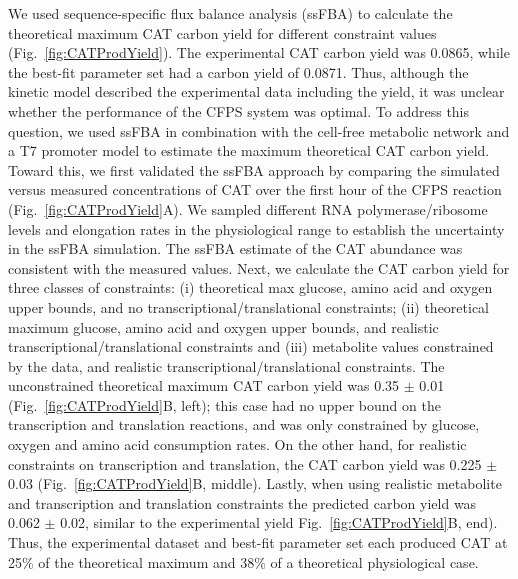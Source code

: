 \documentclass[12pt]{article}
\begin{document}
We used sequence-specific flux balance analysis (ssFBA) to calculate the theoretical maximum CAT carbon yield for different constraint values (Fig.~\ref{fig:CATProdYield}).
The experimental CAT carbon yield was 0.0865, while the best-fit parameter set had a carbon yield of 0.0871.
Thus, although the kinetic model described the experimental data including the yield, it was unclear whether the performance of the CFPS system was optimal.
To address this question, we used ssFBA in combination with the cell-free metabolic network and a T7 promoter model to estimate the maximum theoretical CAT carbon yield.
Toward this, we first validated the ssFBA approach by comparing the simulated versus measured concentrations of CAT over the first hour of the CFPS reaction (Fig.~\ref{fig:CATProdYield}A).
We sampled different RNA polymerase/ribosome levels and elongation rates in the physiological range to establish the uncertainty in the ssFBA simulation.
The ssFBA estimate of the CAT abundance was consistent with the measured values. Next, we calculate the CAT carbon yield for three classes of constraints:
(i) theoretical max glucose, amino acid and oxygen upper bounds, and no transcriptional/translational constraints; (ii) theoretical maximum glucose, amino acid and oxygen upper bounds,
and realistic transcriptional/translational constraints and (iii) metabolite values constrained by the data, and realistic transcriptional/translational constraints.
The unconstrained theoretical maximum CAT carbon yield was 0.35 $\pm$ 0.01 (Fig.~\ref{fig:CATProdYield}B, left);
this case had no upper bound on the transcription and translation reactions, and was only constrained by glucose, oxygen and amino acid consumption rates.
On the other hand, for realistic constraints on transcription and translation, the CAT carbon yield was 0.225 $\pm$ 0.03 (Fig.~\ref{fig:CATProdYield}B, middle).
Lastly, when using realistic metabolite and transcription and translation constraints the predicted carbon yield was 0.062 $\pm$ 0.02, similar to the experimental yield Fig.~\ref{fig:CATProdYield}B, end).
Thus, the experimental dataset and best-fit parameter set each produced CAT at 25\% of the theoretical maximum and 38\% of a theoretical physiological case.
\end{document}
